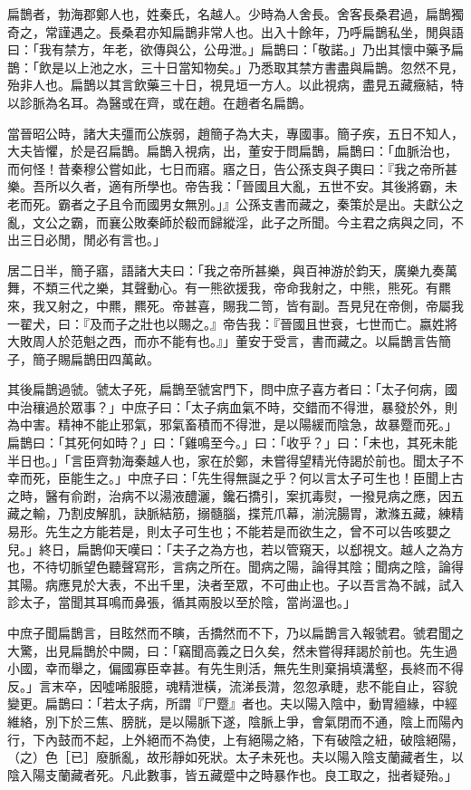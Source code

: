 
\begin{pinyinscope}
扁鵲者，勃海郡鄭人也，姓秦氏，名越人。少時為人舍長。舍客長桑君過，扁鵲獨奇之，常謹遇之。長桑君亦知扁鵲非常人也。出入十餘年，乃呼扁鵲私坐，閒與語曰：「我有禁方，年老，欲傳與公，公毋泄。」扁鵲曰：「敬諾。」乃出其懷中藥予扁鵲：「飲是以上池之水，三十日當知物矣。」乃悉取其禁方書盡與扁鵲。忽然不見，殆非人也。扁鵲以其言飲藥三十日，視見垣一方人。以此視病，盡見五藏癥結，特以診脈為名耳。為醫或在齊，或在趙。在趙者名扁鵲。

當晉昭公時，諸大夫彊而公族弱，趙簡子為大夫，專國事。簡子疾，五日不知人，大夫皆懼，於是召扁鵲。扁鵲入視病，出，董安于問扁鵲，扁鵲曰：「血脈治也，而何怪！昔秦穆公嘗如此，七日而寤。寤之日，告公孫支與子輿曰：『我之帝所甚樂。吾所以久者，適有所學也。帝告我：「晉國且大亂，五世不安。其後將霸，未老而死。霸者之子且令而國男女無別。」』公孫支書而藏之，秦策於是出。夫獻公之亂，文公之霸，而襄公敗秦師於殽而歸縱淫，此子之所聞。今主君之病與之同，不出三日必閒，閒必有言也。」

居二日半，簡子寤，語諸大夫曰：「我之帝所甚樂，與百神游於鈞天，廣樂九奏萬舞，不類三代之樂，其聲動心。有一熊欲援我，帝命我射之，中熊，熊死。有羆來，我又射之，中羆，羆死。帝甚喜，賜我二笥，皆有副。吾見兒在帝側，帝屬我一翟犬，曰：『及而子之壯也以賜之。』帝告我：『晉國且世衰，七世而亡。嬴姓將大敗周人於范魁之西，而亦不能有也。』」董安于受言，書而藏之。以扁鵲言告簡子，簡子賜扁鵲田四萬畝。

其後扁鵲過虢。虢太子死，扁鵲至虢宮門下，問中庶子喜方者曰：「太子何病，國中治穰過於眾事？」中庶子曰：「太子病血氣不時，交錯而不得泄，暴發於外，則為中害。精神不能止邪氣，邪氣畜積而不得泄，是以陽緩而陰急，故暴蹷而死。」扁鵲曰：「其死何如時？」曰：「雞鳴至今。」曰：「收乎？」曰：「未也，其死未能半日也。」「言臣齊勃海秦越人也，家在於鄭，未嘗得望精光侍謁於前也。聞太子不幸而死，臣能生之。」中庶子曰：「先生得無誕之乎？何以言太子可生也！臣聞上古之時，醫有俞跗，治病不以湯液醴灑，鑱石撟引，案扤毒熨，一撥見病之應，因五藏之輸，乃割皮解肌，訣脈結筋，搦髓腦，揲荒爪幕，湔浣腸胃，漱滌五藏，練精易形。先生之方能若是，則太子可生也；不能若是而欲生之，曾不可以告咳嬰之兒。」終日，扁鵲仰天嘆曰：「夫子之為方也，若以管窺天，以郄視文。越人之為方也，不待切脈望色聽聲寫形，言病之所在。聞病之陽，論得其陰；聞病之陰，論得其陽。病應見於大表，不出千里，決者至眾，不可曲止也。子以吾言為不誠，試入診太子，當聞其耳鳴而鼻張，循其兩股以至於陰，當尚溫也。」

中庶子聞扁鵲言，目眩然而不瞚，舌撟然而不下，乃以扁鵲言入報虢君。虢君聞之大驚，出見扁鵲於中闕，曰：「竊聞高義之日久矣，然未嘗得拜謁於前也。先生過小國，幸而舉之，偏國寡臣幸甚。有先生則活，無先生則棄捐填溝壑，長終而不得反。」言末卒，因噓唏服臆，魂精泄橫，流涕長潸，忽忽承睫，悲不能自止，容貌變更。扁鵲曰：「若太子病，所謂『尸蹷』者也。夫以陽入陰中，動胃繵緣，中經維絡，別下於三焦、膀胱，是以陽脈下遂，陰脈上爭，會氣閉而不通，陰上而陽內行，下內鼓而不起，上外絕而不為使，上有絕陽之絡，下有破陰之紐，破陰絕陽，（之）色［已］廢脈亂，故形靜如死狀。太子未死也。夫以陽入陰支蘭藏者生，以陰入陽支蘭藏者死。凡此數事，皆五藏蹙中之時暴作也。良工取之，拙者疑殆。」


\end{pinyinscope}
